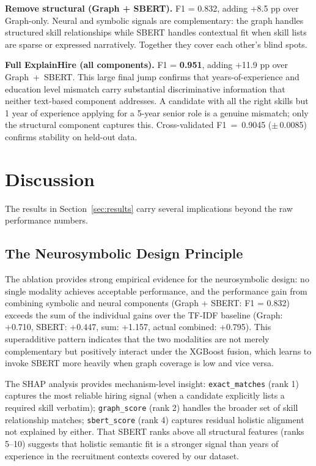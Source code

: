 \documentclass[conference]{IEEEtran}
\begin{document}
\textbf{Remove structural (Graph + SBERT).}
F1 = 0.832, adding +8.5 pp over Graph-only. Neural and symbolic signals
are complementary: the graph handles structured skill relationships while
SBERT handles contextual fit when skill lists are sparse or expressed
narratively. Together they cover each other's blind spots.

\textbf{Full ExplainHire (all components).}
F1 = \textbf{0.951}, adding +11.9 pp over Graph~+~SBERT. This large final
jump confirms that years-of-experience and education level mismatch
carry substantial discriminative information that neither text-based
component addresses. A candidate with all the right skills but 1 year of
experience applying for a 5-year senior role is a genuine mismatch;
only the structural component captures this. Cross-validated
F1~=~0.9045 ($\pm$\,0.0085) confirms stability on held-out data.

\section{Discussion}
\label{sec:discussion}

The results in Section~\ref{sec:results} carry several implications beyond
the raw performance numbers.

\subsection{The Neurosymbolic Design Principle}
The ablation provides strong empirical evidence for the neurosymbolic
design: no single modality achieves acceptable performance, and the
performance gain from combining symbolic and neural components
(Graph + SBERT: F1 = 0.832) exceeds the sum of the individual gains
over the TF-IDF baseline (Graph: +0.710, SBERT: +0.447, sum: +1.157,
actual combined: +0.795). This superadditive pattern indicates that
the two modalities are not merely complementary but positively interact
under the XGBoost fusion, which learns to invoke SBERT more heavily
when graph coverage is low and vice versa.

The SHAP analysis provides mechanism-level insight: \texttt{exact\_matches}
(rank 1) captures the most reliable hiring signal (when a candidate explicitly
lists a required skill verbatim); \texttt{graph\_score} (rank 2) handles the
broader set of skill relationship matches; \texttt{sbert\_score} (rank 4)
captures residual holistic alignment not explained by either. That SBERT
ranks above all structural features (ranks 5--10) suggests that holistic
semantic fit is a stronger signal than years of experience in the
recruitment contexts covered by our dataset.
\end{document}
